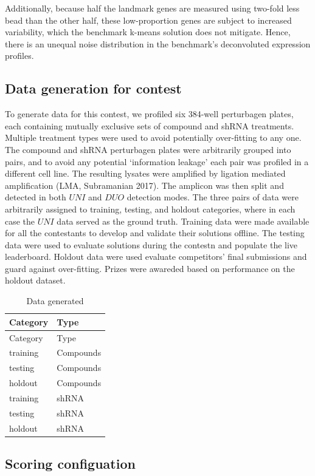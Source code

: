 \documentclass[]{article}
\begin{document}
Additionally, because half the landmark genes are measured using
two-fold less bead than the other half, these low-proportion genes are
subject to increased variability, which the benchmark k-means solution
does not mitigate. Hence, there is an unequal noise distribution in the
benchmark's deconvoluted expression profiles.

\hypertarget{data-generation-for-contest}{%
\subsection{Data generation for
contest}\label{data-generation-for-contest}}

To generate data for this contest, we profiled six 384-well perturbagen
plates, each containing mutually exclusive sets of compound and shRNA
treatments. Multiple treatment types were used to avoid potentially
over-fitting to any one. The compound and shRNA perturbagen plates were
arbitrarily grouped into pairs, and to avoid any potential `information
leakage' each pair was profiled in a different cell line. The resulting
lysates were amplified by ligation mediated amplification (LMA,
Subramanian 2017). The amplicon was then split and detected in both
\(UNI\) and \(DUO\) detection modes. The three pairs of data were
arbitrarily assigned to training, testing, and holdout categories, where
in each case the \(UNI\) data served as the ground truth. Training data
were made available for all the contestants to develop and validate
their solutions offline. The testing data were used to evaluate
solutions during the contestn and populate the live leaderboard. Holdout
data were used evaluate competitors' final submissions and guard against
over-fitting. Prizes were awareded based on performance on the holdout
dataset.

\begin{longtable}[]{@{}ll@{}}
\caption{Data generated}\tabularnewline
\toprule
Category & Type\tabularnewline
\midrule
\endfirsthead
\toprule
Category & Type\tabularnewline
\midrule
\endhead
training & Compounds\tabularnewline
testing & Compounds\tabularnewline
holdout & Compounds\tabularnewline
training & shRNA\tabularnewline
testing & shRNA\tabularnewline
holdout & shRNA\tabularnewline
\bottomrule
\end{longtable}

\hypertarget{scoring-configuation}{%
\subsection{Scoring configuation}\label{scoring-configuation}}
\end{document}
